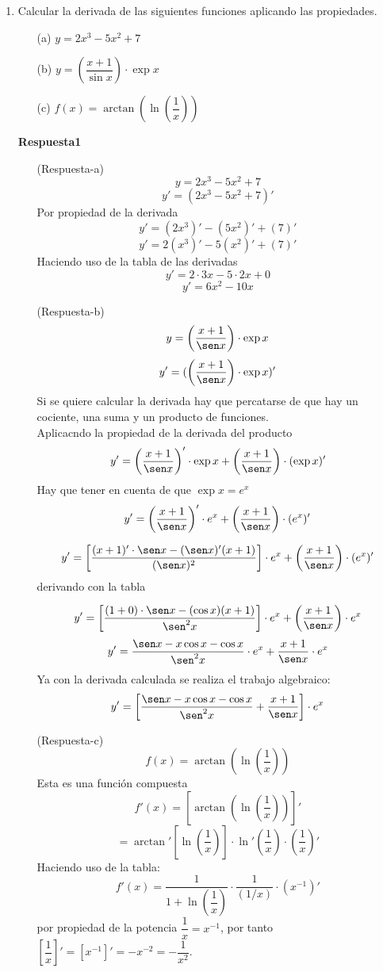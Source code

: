 \documentclass[10pt,twoside]{SelfArx} %
\begin{document}
\begin{enumerate}
	\item Calcular la derivada de las siguientes funciones aplicando las propiedades.
	\begin{enumerate}
		\item[(a)]	$ y=2x^{3}-5x^{2}+7 $
		\item[(b)]	$ y=\left(\dfrac{x+1}{\sin x}\right)\cdot\exp x $
		\item[(c)]	$ f(x)=\arctan\left (\ln\left (\dfrac{1}{x}\right )\right ) $
	\end{enumerate}
	\textbf{Respuesta1}\\
\begin{enumerate}
	\item[(Respuesta-a)]
	\[  y=2x^{3}-5x^{2}+7  \]
	\[ y'=(2x^{3}-5x^{2}+7)' \]
	Por propiedad de la derivada
	\[ y'=(2x^{3})'-(5x^{2})'+(7)' \]
	\[ y'=2(x^{3})'-5(x^{2})'+(7)' \]
	Haciendo uso de la tabla de las derivadas
	\[ y'=2\cdot3x-5\cdot2x+0 \] 
	\[ y'=6x^{2}-10x \]
	
	\item[(Respuesta-b)]
	\[ y=\left(\dfrac{x+1}{\sen x}\right)\cdot\exp x \]
	\[ y'=(\left(\dfrac{x+1}{\sen x}\right)\cdot\exp x)' \]
	Si se quiere calcular la derivada hay que percatarse de que hay un cociente, una suma y un producto de funciones.\\
	Aplicacndo la propiedad de la derivada del producto
	\[ y'=\left(\dfrac{x+1}{\sen x}\right)'\cdot\exp x+\left(\dfrac{x+1}{\sen x}\right)\cdot(\exp x)' \]
	Hay que tener en cuenta de que $ \exp x=e^{x} $
	\[ y'=\left(\dfrac{x+1}{\sen x}\right)'\cdot e^{x}+\left(\dfrac{x+1}{\sen x}\right)\cdot (e^{x})' \]
	
	\[ y'=\left[\dfrac{(x+1)'\cdot\sen x -(\sen x)'(x+1)}{(\sen x)^{2}}\right]\cdot e^{x}+\left(\dfrac{x+1}{\sen x}\right)\cdot (e^{x})'
\]
	derivando con la tabla
	
	\[ y'=\left[\dfrac{(1+0)\cdot\sen x -(\cos x)(x+1)}{\sen^{2} x}\right]\cdot e^{x}+\left(\dfrac{x+1}{\sen x}\right)\cdot e^{x}
	\]
	\[ y'=\dfrac{\sen x-x\cos x-\cos x}{\sen^{2}x}\cdot e^{x}+\dfrac{x+1}{\sen x}\cdot e^{x} \]
	Ya con la derivada calculada se realiza el trabajo algebraico:\\
	\[ y'=\left [\dfrac{\sen x-x\cos x-\cos x}{\sen^{2}x}+\dfrac{x+1}{\sen x}\right ]\cdot e^{x} \]
	
	
	
	\item[(Respuesta-c)]	
	\[  f(x)=\arctan\left (\ln\left (\dfrac{1}{x}\right )\right )  \]
	Esta es una función compuesta
	\[  f'(x)=\left[\arctan\left (\ln\left (\dfrac{1}{x}\right )\right)\right]' \]
	\[ =\arctan'\left[ \ln\left (\dfrac{1}{x}\right )\right ]\cdot\ln'\left (\dfrac{1}{x}\right )\cdot\left (\dfrac{1}{x}\right )'  \]
	Haciendo uso de la tabla:
	\[ f'(x)=\dfrac{1}{1+\ln \left (\dfrac{1}{x} \right )}\cdot\dfrac{1}{(1/x)}\cdot(x^{-1})' \]
	por propiedad de la potencia $ \dfrac{1}{x}=x^{-1} $, por tanto $ \left [\dfrac{1}{x}\right ]'=\left [x^{-1}\right ]'=-x^{-2}=-\dfrac{1}{x^{2}} $.
	

\end{enumerate}
\end{enumerate}
\end{document}
